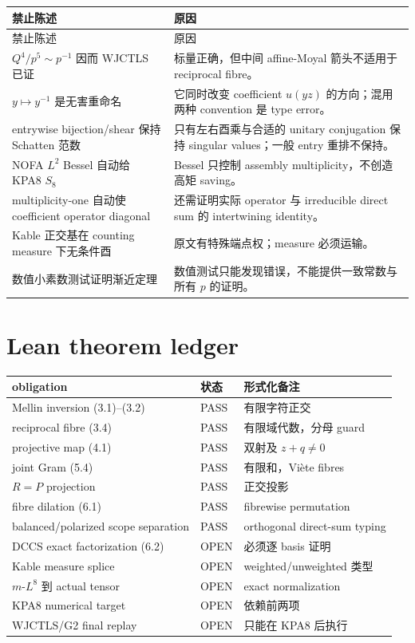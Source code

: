 \documentclass[11pt,a4paper]{ctexart}
\theoremstyle{definition}
\newcommand{\1}{\mathbf 1}
\newcommand{\OPEN}{\textcolor{red!70!black}{\textsf{OPEN}}}
\newcommand{\PASS}{\textcolor{green!45!black}{\textsf{PASS}}}
\begin{document}
\begin{longtable}{p{}p{}}
\toprule
禁止陈述 & 原因\\
\midrule
\endfirsthead
\toprule
禁止陈述 & 原因\\
\midrule
\endhead
$Q^4/p^5\sim p^{-1}$ 因而 WJCTLS 已证
& 标量正确，但中间 affine-Moyal 箭头不适用于 reciprocal fibre。\\
$y\mapsto y^{-1}$ 是无害重命名
& 它同时改变 coefficient $u(yz)$ 的方向；混用两种 convention 是 type error。\\
entrywise bijection/shear 保持 Schatten 范数
& 只有左右酉乘与合适的 unitary conjugation 保持 singular values；一般 entry
重排不保持。\\
NOFA $L^2$ Bessel 自动给 KPA8 $S_8$
& Bessel 只控制 assembly multiplicity，不创造高矩 saving。\\
multiplicity-one 自动使 coefficient operator diagonal
& 还需证明实际 operator 与 irreducible direct sum 的 intertwining identity。\\
Kable 正交基在 counting measure 下无条件酉
& 原文有特殊端点权；measure 必须运输。\\
数值小素数测试证明渐近定理
& 数值测试只能发现错误，不能提供一致常数与所有 $p$ 的证明。\\
\bottomrule
\end{longtable}

\section{Lean theorem ledger}

\begin{center}
\begin{tabular}{p{}p{}p{}}
\toprule
obligation & 状态 & 形式化备注\\
\midrule
Mellin inversion (3.1)--(3.2) & \PASS & 有限字符正交\\
reciprocal fibre (3.4) & \PASS & 有限域代数，分母 guard\\
projective map (4.1) & \PASS & 双射及 $z+q\ne0$\\
joint Gram (5.4) & \PASS & 有限和，Vi\`ete fibres\\
$R=P$ projection & \PASS & 正交投影\\
fibre dilation (6.1) & \PASS & fibrewise permutation\\
balanced/polarized scope separation & \PASS & orthogonal direct-sum typing\\
DCCS exact factorization (6.2) & \OPEN & 必须逐 basis 证明\\
Kable measure splice & \OPEN & weighted/unweighted 类型\\
$m$-$L^8$ 到 actual tensor & \OPEN & exact normalization\\
KPA8 numerical target & \OPEN & 依赖前两项\\
WJCTLS/G2 final replay & \OPEN & 只能在 KPA8 后执行\\
\bottomrule
\end{tabular}
\end{center}
\end{document}
